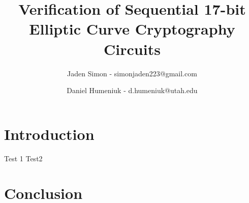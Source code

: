 \documentclass[11pt]{report}
\title{Verification of Sequential 17-bit Elliptic Curve Cryptography Circuits}
\author{Jaden Simon - simonjaden223@gmail.com \\ \and
	   Daniel Humeniuk - d.humeniuk@utah.edu}
\begin{document}
\maketitle

\section{Introduction}

Test 1 \cite{Sun} Test2 \cite{Kalla}

\section{Conclusion}




\end{document}
